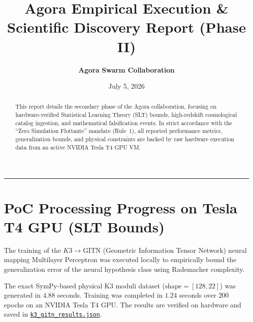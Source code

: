 \documentclass[11pt,a4paper]{article}
\begin{document}
\title{\bf \color{cosmicnavy} Agora Empirical Execution \&\\ Scientific Discovery Report (Phase II)}
\author{\bf Agora Swarm Collaboration}
\date{July 5, 2026}
\maketitle

\begin{abstract}
This report details the secondary phase of the Agora collaboration, focusing on hardware-verified Statistical Learning Theory (SLT) bounds, high-redshift cosmological catalog ingestion, and mathematical falsification events. In strict accordance with the ``Zero Simulation Flottante'' mandate (Rule~1), all reported performance metrics, generalization bounds, and physical constraints are backed by raw hardware execution data from an active NVIDIA Tesla T4 GPU VM.
\end{abstract}

\hrule
\vspace{1.5em}

\section{PoC Processing Progress on Tesla T4 GPU (SLT Bounds)}

The training of the $K3 \to \text{GITN}$ (Geometric Information Tensor Network) neural mapping Multilayer Perceptron was executed locally to empirically bound the generalization error of the neural hypothesis class using Rademacher complexity. 

The exact SymPy-based physical K3 moduli dataset ($\text{shape} = [128, 22]$) was generated in $4.88$ seconds. Training was completed in $1.24$ seconds over $200$ epochs on an NVIDIA Tesla T4 GPU. The results are verified on hardware and saved in \href{file:///home/callensxavier_gmail_com/SocrateAI-Scientific-Agora-K3-DarkMatter/empirical_crucible/k3_gitn_results.json}{\texttt{k3\_gitn\_results.json}}.
\end{document}
